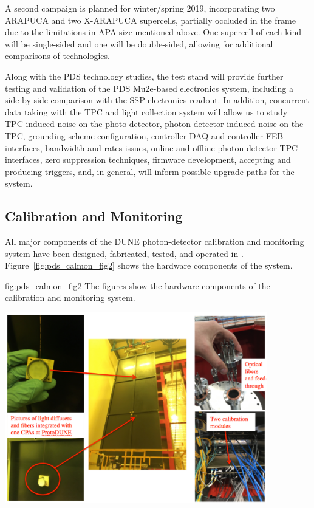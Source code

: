 A second campaign is planned for winter/spring 2019, incorporating two ARAPUCA and two X-ARAPUCA supercells, partially occluded in the frame due to the limitations in APA size mentioned above.  One supercell of each kind will be single-sided and one will be double-sided, allowing for additional comparisons of  technologies.

Along with the PDS technology studies, the test stand will  provide further testing and validation of the PDS Mu2e-based electronics system, including a side-by-side comparison with the  SSP electronics readout. In addition, concurrent data taking with the TPC and light collection system will allow us to study TPC-induced noise on the photo-detector, photon-detector-induced noise on the TPC, grounding scheme configuration, controller-DAQ and controller-FEB interfaces, bandwidth and rates issues, online and offline photon-detector-TPC interfaces, zero suppression techniques, firmware development, accepting and producing triggers, and, in general, will inform possible upgrade paths for the system. 


\subsection{Calibration and Monitoring}
\label{sec:fdsp-pd-validation-candm}


All major components of the DUNE photon-detector calibration and monitoring system have been designed, fabricated, tested, and operated in .
Figure~\ref{fig:pds_calmon_fig2} shows the hardware components of the system.

 \begin{dunefigure}
 {fig:pds_calmon_fig2}
 {The figures show the hardware components of the  calibration and monitoring system.}
 \includegraphics[angle=0,width=11.4cm,height=9cm]{graphics/pds-calmon-fig2.png}
\end{dunefigure}

